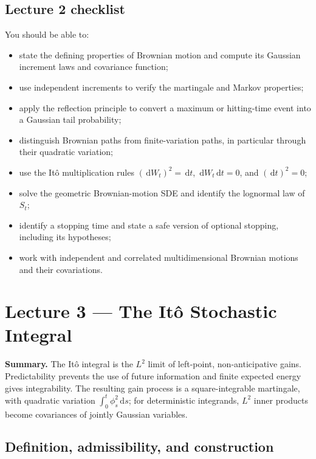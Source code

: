 \documentclass[11pt]{article}
\newcommand{\dd}{\,\mathrm{d}}
\newcommand{\1}{\mathbf{1}}
\theoremstyle{plain}
\theoremstyle{definition}
\theoremstyle{remark}
\newcommand{\lecturesummary}[1]{%
\begin{center}
\begin{minipage}{0.95\linewidth}
\small\textbf{Summary.} #1
\end{minipage}
\end{center}
\vspace{0.5em}
}
\begin{document}
\subsection*{Lecture 2 checklist}

You should be able to:
\begin{itemize}[leftmargin=1.5em,itemsep=0.15em]
  \item state the defining properties of Brownian motion and compute its
        Gaussian increment laws and covariance function;
  \item use independent increments to verify the martingale and Markov
        properties;
  \item apply the reflection principle to convert a maximum or hitting-time
        event into a Gaussian tail probability;
  \item distinguish Brownian paths from finite-variation paths, in particular
        through their quadratic variation;
  \item use the It\^o multiplication rules
        $(\dd W_t)^2=\dd t$, $\dd W_t\dd t=0$, and $(\dd t)^2=0$;
  \item solve the geometric Brownian-motion SDE and identify the
        lognormal law of $S_t$;
  \item identify a stopping time and state a safe version of optional
        stopping, including its hypotheses;
  \item work with independent and correlated multidimensional Brownian
        motions and their covariations.
\end{itemize}


\section{Lecture 3 --- The It\^o Stochastic Integral}

\lecturesummary{The It\^o integral is the $L^2$ limit of left-point,
non-anticipative gains. Predictability prevents the use of future
information and finite expected energy gives integrability. The resulting
gain process is a square-integrable martingale, with quadratic variation
$\int_0^t\phi_s^2\dd s$; for deterministic integrands, $L^2$ inner products
become covariances of jointly Gaussian variables.}

\subsection{Definition, admissibility, and construction}
\end{document}
